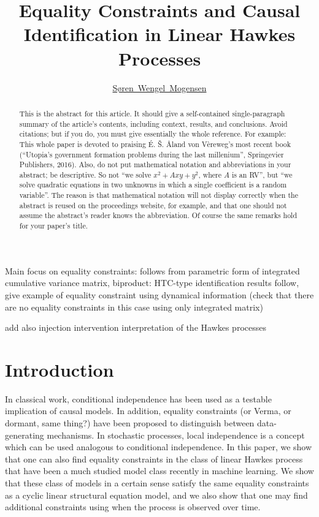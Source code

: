 \documentclass[accepted]{uai2021} %
\title{Equality Constraints and Causal Identification in Linear Hawkes 
Processes}
\author[1]{\href{mailto: Søren Wengel Mogensen 
<swemo@dtu.dk>}{Søren~Wengel~Mogensen}{}}
\affil[1]{%
    Section of Cognitive Systems\\
    Technical University of Denmark\\
    Denmark
}
\begin{document}
\maketitle

\begin{abstract}
  This is the abstract for this article.
  It should give a self-contained single-paragraph summary of the article's contents, including context, results, and conclusions.
  Avoid citations; but if you do, you must give essentially the whole reference.
  For example: This whole paper is devoted to praising É. Š. Åland von Vèreweg's most recent book (“Utopia's government formation problems during the last millenium”, Springevier Publishers, 2016).
  Also, do not put mathematical notation and abbreviations in your abstract; be descriptive.
  So not “we solve \(x^2+A xy+y^2\), where \(A\) is an RV”, but “we solve quadratic equations in two unknowns in which a single coefficient is a random variable”.
  The reason is that mathematical notation will not display correctly when the abstract is reused on the proceedings website, for example, and that one should not assume the abstract's reader knows the abbreviation.
  Of course the same remarks hold for your paper's title.
\end{abstract}

Main focus on equality constraints: follows from parametric form of integrated 
cumulative variance matrix, biproduct: HTC-type identification results follow, 
give example of equality constraint using dynamical information (check that 
there are no equality constraints in this case using only integrated matrix)

add also injection intervention interpretation of the Hawkes processes

\section{Introduction}\label{sec:intro}

In classical work, conditional independence has been used as a testable 
implication of causal models. In addition, equality constraints (or Verma, or 
dormant, same thing?) have been proposed to distinguish between data-generating 
mechanisms. In stochastic processes, local independence is a concept which can 
be used analogous to conditional independence. In this paper, we show that one 
can also find equality constraints in the class of linear Hawkes process that 
have been a much studied model class recently in machine learning. We show that 
these class of models in a certain sense satisfy the same equality constraints 
as a cyclic linear structural equation model, and we also show that one may 
find additional constraints using when the process is observed over time.
\end{document}

